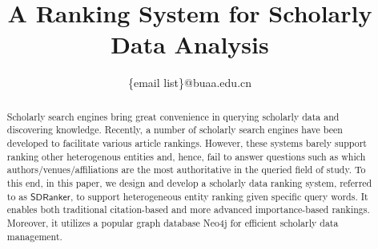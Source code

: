 \documentclass[10pt,conference,letterpaper]{IEEEtran}
\newcommand{\eat}[1]{}
\newcommand{\kw}[1]{{\ensuremath {\mathsf{#1}}}\xspace}
\newcommand{\oursystem}{\kw{SDRanker}}
\begin{document}
\title{A Ranking System for Scholarly Data Analysis}

\eat{
\author{\IEEEauthorblockN{Michael Shell}
\IEEEauthorblockA{School of Electrical and\\Computer Engineering\\
Georgia Institute of Technology\\
Atlanta, Georgia 30332--0250\\
Email: http://www.michaelshell.org/contact.html}
\and
\IEEEauthorblockN{Homer Simpson}
\IEEEauthorblockA{Twentieth Century Fox\\
Springfield, USA\\
Email: homer@thesimpsons.com}
\and
\IEEEauthorblockN{James Kirk\\ and Montgomery Scott}
\IEEEauthorblockA{Starfleet Academy\\
San Francisco, California 96678--2391\\
Telephone: (800) 555--1212\\
Fax: (888) 555--1212}}
}%

\author{
\{email list\}@buaa.edu.cn}

\maketitle


\begin{abstract}
Scholarly search engines bring great convenience in querying scholarly data and discovering knowledge.
%
Recently, a number of scholarly search engines have been developed to facilitate various article rankings. However, these systems barely support ranking other heterogenous entities and, hence, fail to answer questions such as which authors/venues/affiliations are the most authoritative in the queried field of study.
%
To this end, in this paper, we design and develop a scholarly data ranking system, referred to as \oursystem, to support heterogeneous entity ranking given specific query words. It enables both traditional citation-based and more advanced importance-based rankings. Moreover, it utilizes a popular graph database Neo4j for efficient scholarly data management.
\end{abstract}
\end{document}
